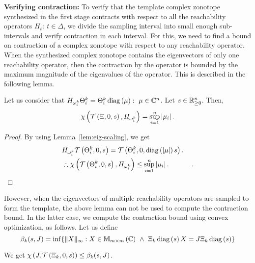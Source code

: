 {\bf Verifying contraction:} To verify that the template complex
zonotope synthesized in the first stage contracts with respect to all
the reachability operators $H_t:~t\in\Delta$, we divide the sampling
interval into small enough sub-intervals and verify contraction in
each interval.  For this, we need to find a bound on contraction of a
complex zonotope with respect to any reachability operator.  When the
synthesized complex zonotope contains the eigenvectors of only one
reachability operator, then the contraction by the operator is bounded
by the maximum magnitude of the eigenvalues of the operator.  This is
described in the following lemma.
%
\begin{lemma}
Let us consider that
$H_{\omega_i^k}\Theta_i^k=\Theta^k_i\diagonal{\mu}:~\mu\in\compnums^n$.
Let $\sfact\in\reals_{\geq 0}^n$.  Then,
%
\[
\contraction{H_{\omega^k_i}}{\tcztope{\eigenvectors}{0}{\sfact}}=\max_{i=1}^n\absolute{\mu_i}.
\]
%
\end{lemma}
%
\begin{proof}
By using Lemma~\ref{lem:eig-scaling}, we get
%
\begin{align*}
&
 H_{\omega^k_i}\tcztope{\Theta^k_i}{0}{\sfact} =
 \tcztope{\Theta^k_i}{0}{\diagonal{\absolute{\mu}}{\sfact}}.\\
& \therefore  \contraction{H_{\omega^k_i}}{\tcztope{\Theta^k_i}{0}{\sfact}}\leq\max_{i=1}^n\absolute{\mu_i}.~\hspace{3em}\qedhere.
\end{align*}
\end{proof}
%
However, when the eigenvectors of multiple reachability operators are
sampled to form the template, the above lemma can not be used to
compute the contraction bound.  In the latter case, we compute the
contraction bound using convex optimization, as follows.  Let us
define
\[\beta_k(\sfact,J)=\min\{\|\tmat\|_\infty:\tmat\in\mat{m}{m}{\compnums}~\wedge~
\eigenvectors_k\diagonal{\sfact}X=J\eigenvectors_k\diagonal{\sfact}\}\] 
%
\begin{lemma}\label{lem:contLin}
We get $\chi\lt(J,\tcztope{\eigenvectors_k}{0}{\sfact}\rt)\leq \beta_k(\sfact,J)$.
%
\end{lemma}
%
